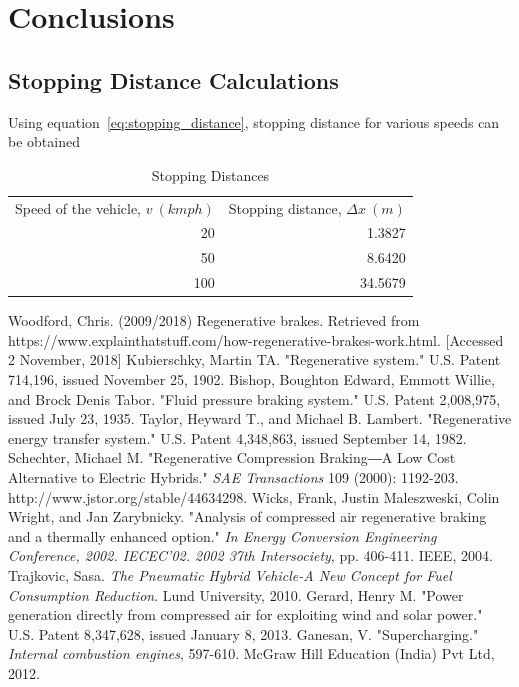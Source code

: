 \documentclass[12pt,a4paper]{article}
\begin{document}
\section{Conclusions}
	\subsection{Stopping Distance Calculations}
		Using equation~\ref{eq:stopping_distance}, stopping distance for various speeds can be obtained

		\begin{table}[H]
			\centering
			\begin{tabular}{r r}
				Speed of the vehicle, \( v \ (kmph) \) & Stopping distance, \( \Delta x \ (m) \) \\
				20 & 1.3827 \\
				50 & 8.6420 \\
				100 & 34.5679
			\end{tabular}
			\caption{Stopping Distances}
			\label{tab:stopping_distances}
		\end{table}

\begin{thebibliography}{9}
		Woodford, Chris. (2009/2018) Regenerative brakes. Retrieved from https://www.explainthatstuff.com/how-regenerative-brakes-work.html. [Accessed 2 November, 2018]
		Kubierschky, Martin TA. "Regenerative system." U.S. Patent 714,196, issued November 25, 1902.
		Bishop, Boughton Edward, Emmott Willie, and Brock Denis Tabor. "Fluid pressure braking system." U.S. Patent 2,008,975, issued July 23, 1935.
		Taylor, Heyward T., and Michael B. Lambert. "Regenerative energy transfer system." U.S. Patent 4,348,863, issued September 14, 1982.
		Schechter, Michael M. "Regenerative Compression Braking―A Low Cost Alternative to Electric Hybrids." \textit{SAE Transactions} 109 (2000): 1192-203. http://www.jstor.org/stable/44634298.
		Wicks, Frank, Justin Maleszweski, Colin Wright, and Jan Zarybnicky. "Analysis of compressed air regenerative braking and a thermally enhanced option." \textit{In Energy Conversion Engineering Conference, 2002. IECEC'02. 2002 37th Intersociety}, pp. 406-411. IEEE, 2004.
		Trajkovic, Sasa. \textit{The Pneumatic Hybrid Vehicle-A New Concept for Fuel Consumption Reduction}. Lund University, 2010.
		Gerard, Henry M. "Power generation directly from compressed air for exploiting wind and solar power." U.S. Patent 8,347,628, issued January 8, 2013.
		Ganesan, V. "Supercharging." \textit{Internal combustion engines}, 597-610. McGraw Hill Education (India) Pvt Ltd, 2012.
\end{thebibliography}

\begin{appendices}
	\printnomenclature{}
	\listoffigures
	\listoftables
\end{appendices}
\end{document}
